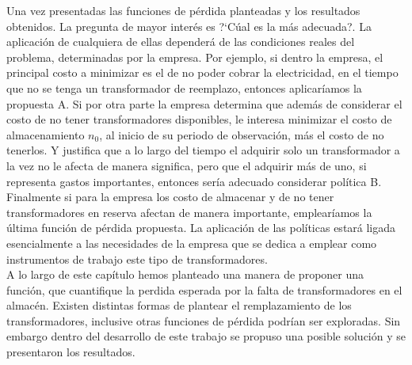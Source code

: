 \noindent Una vez presentadas las funciones  de p\'erdida planteadas y los resultados obtenidos. La pregunta de mayor inter\'es es ?`C\'ual es la m\'as adecuada?. La aplicaci\'on de cualquiera de ellas depender\'a de las condiciones reales del problema, determinadas por la empresa. Por ejemplo, si dentro la empresa, el principal costo a minimizar es el de no poder cobrar la electricidad, en el tiempo que no se tenga un transformador de reemplazo, entonces aplicar\'iamos la propuesta A. Si  por otra parte la empresa determina que adem\'as de considerar el costo de no tener transformadores disponibles, le  interesa minimizar el costo de almacenamiento $n_0$, al inicio de su periodo de observaci\'on, m\'as el costo de no tenerlos. Y justifica que a lo largo del tiempo el adquirir solo un transformador  a la vez no le afecta de manera significa, pero que el adquirir m\'as de uno, si representa gastos importantes, entonces ser\'ia adecuado considerar pol\'itica B. Finalmente si para la empresa los costo de almacenar y de no tener transformadores en reserva afectan de manera importante, emplear\'iamos la \'ultima funci\'on de p\'erdida propuesta. La aplicaci\'on de las pol\'iticas estar\'a ligada esencialmente a las necesidades de la empresa que se dedica a emplear como instrumentos de trabajo este tipo de transformadores. \\[0.2cm]
\noindent A lo largo de este cap\'itulo hemos planteado una manera de proponer una funci\'on, que cuantifique  la perdida esperada por la falta de transformadores en el almac\'en. Existen distintas formas de plantear el remplazamiento de los transformadores, inclusive otras funciones de p\'erdida podr\'ian ser exploradas. Sin embargo dentro del desarrollo de este trabajo se propuso una posible soluci\'on y se presentaron los resultados.



\newpage \thispagestyle{empty} \cleardoublepage

%
